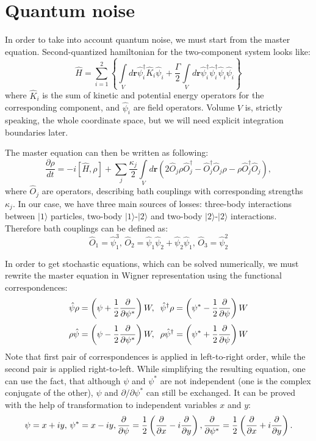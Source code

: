 \documentclass[12pt,notitlepage]{report}
\begin{document}
\section*{Quantum noise}

In order to take into account quantum noise, we must start from the master equation. Second-quantized hamiltonian for the two-component system looks like:
\[
\hat{H} = \sum\limits^2_{i=1} \left\{ \int\limits_V d\textbf{r} \hat{\psi}_i^\dagger \hat{K}_i \hat{\psi}_i +
\frac{\Gamma}{2} \int\limits_V d\textbf{r} \hat{\psi}_i^\dagger \hat{\psi}_i^\dagger \hat{\psi}_i \hat{\psi}_i \right\}
\]
where $\hat{K}_i$ is the sum of kinetic and potential energy operators for the corresponding component, and $\hat{\psi}_i$ are field operators. Volume $V$ is, strictly speaking, the whole coordinate space, but we will need explicit integration boundaries later.

The master equation can then be written as following:
\[
\frac{\partial\rho}{dt} = -i [\hat{H}, \rho] + \sum\limits_j \frac{\kappa_j}{2} \int\limits_V d\textbf{r}
\left( 2  \hat{O}_j \rho \hat{O}_j^\dagger - \hat{O}_j^\dagger \hat{O}_j \rho - \rho \hat{O}_j^\dagger \hat{O}_j \right),
\]
where $\hat{O}_j$ are operators, describing bath couplings with corresponding strengths $\kappa_j$. In our case, we have three main sources of losses: three-body interactions between $\vert1\rangle$ particles, two-body $\vert1\rangle$-$\vert2\rangle$ and two-body $\vert2\rangle$-$\vert2\rangle$ interactions. Therefore bath couplings can be defined as:
\[
\hat{O}_1 = \hat{\psi}_1^3,\, \hat{O}_2 = \hat{\psi}_1 \hat{\psi}_2 + \hat{\psi}_2 \hat{\psi}_1,\, \hat{O}_3 = \hat{\psi}_2^2
\]

In order to get stochastic equations, which can be solved numerically, we must rewrite the master equation in Wigner representation using the functional correspondences:
\[
\hat{\psi} \rho = \left( \psi + \frac{1}{2} \frac{\partial}{\partial \psi^*} \right) W,\;\;\; \\
\hat{\psi}^\dagger \rho = \left( \psi^* - \frac{1}{2} \frac{\partial}{\partial \psi} \right) W
\]
\[
\rho \hat{\psi} = \left( \psi - \frac{1}{2} \frac{\partial}{\partial \psi^*} \right) W,\;\;\; \\
\rho \hat{\psi}^\dagger = \left( \psi^* + \frac{1}{2} \frac{\partial}{\partial \psi} \right) W
\]
Note that first pair of correspondences is applied in left-to-right order, while the second pair is applied right-to-left. While simplifying the resulting equation, one can use the fact, that although $\psi$ and $\psi^*$ are not independent (one is the complex conjugate of the other), $\psi$ and $\partial/\partial\psi^*$ can still be exchanged. It can be proved with the help of transformation to independent variables $x$ and $y$:
\[
\psi = x + iy,\, \psi^* = x - iy,\, \\
\frac{\partial}{\partial\psi} = \frac{1}{2} \left( \frac{\partial}{\partial x} - i \frac{\partial}{\partial y} \right),\, \\
\frac{\partial}{\partial\psi^*} = \frac{1}{2} \left( \frac{\partial}{\partial x} + i \frac{\partial}{\partial y} \right).
\]
\end{document}
